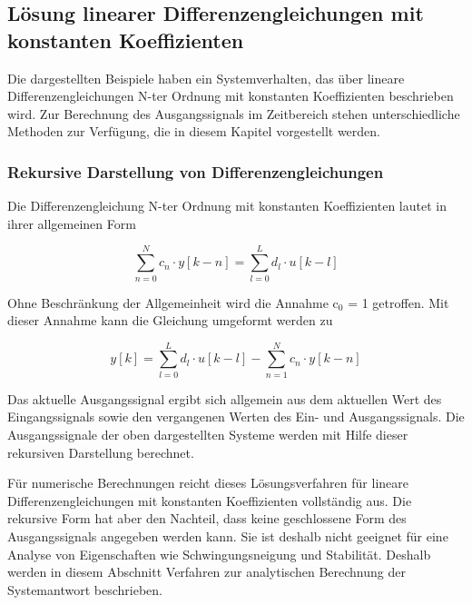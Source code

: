 \clearpage

\subsection{L\"{o}sung linearer Differenzengleichungen mit konstanten Koeffizienten}\label{fourthree}

\noindent Die dargestellten Beispiele haben ein Systemverhalten, das \"{u}ber lineare Differenzengleichungen N-ter Ordnung mit konstanten Koeffizienten beschrieben wird. Zur Berechnung des Ausgangssignals im Zeitbereich stehen unterschiedliche Methoden zur Verf\"{u}gung, die in diesem Kapitel vorgestellt werden.

\subsubsection{Rekursive Darstellung von Differenzengleichungen}

\noindent Die Differenzengleichung N-ter Ordnung mit konstanten Koeffizienten lautet in ihrer allgemeinen Form

\begin{equation}\label{eq:fourfourtyfive}
\sum _{n=0}^{N}c_{n} \cdot y\left[k-n\right] =\sum _{l=0}^{L}d_{l} \cdot u\left[k-l\right] 
\end{equation}

\noindent Ohne Beschr\"{a}nkung der Allgemeinheit wird die Annahme c${}_{0}$ = 1 getroffen. Mit dieser Annahme kann die Gleichung umgeformt werden zu

\begin{equation}\label{eq:fourfourtysix}
y\left[k\right]=\sum _{l=0}^{L}d_{l} \cdot u\left[k-l\right] -\sum _{n=1}^{N}c_{n} \cdot y\left[k-n\right] 
\end{equation}

\noindent Das aktuelle Ausgangssignal ergibt sich allgemein aus dem aktuellen Wert des Eingangssignals sowie den vergangenen Werten des Ein- und Ausgangssignals. Die Ausgangssignale der oben dargestellten Systeme werden mit Hilfe dieser rekursiven Darstellung berechnet.\medskip

\noindent F\"{u}r numerische Berechnungen reicht dieses L\"{o}sungsverfahren f\"{u}r lineare Differenzengleichungen mit konstanten Koeffizienten vollst\"{a}ndig aus. Die rekursive Form hat aber den Nachteil, dass keine geschlossene Form des Ausgangssignals angegeben werden kann. Sie ist deshalb nicht geeignet f\"{u}r eine Analyse von Eigenschaften wie Schwingungsneigung und Stabilit\"{a}t. Deshalb werden in diesem Abschnitt Verfahren zur analytischen Berechnung der Systemantwort beschrieben.

